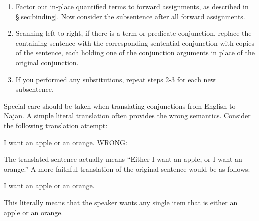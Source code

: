 \begin{enumerate}
	\item Factor out in-place quantified terms to forward assignments, as
	      described in \S\ref{sec:binding}. Now consider the subsentence after
	      all forward assignments.
	\item Scanning left to right, if there is a term or predicate conjunction,
	      replace the containing sentence with the corresponding sentential
	      conjunction with copies of the sentence, each holding one of the conjunction
	      arguments in place of the original conjunction.
	\item If you performed any substitutions, repeat steps 2-3 for each new
	      subsentence.
\end{enumerate}


Special care should be taken when translating conjunctions from English to
Najan. A simple literal translation often provides the wrong semantics. Consider
the following translation attempt:

{I want an apple or an orange.}
{WRONG: }

The translated sentence actually means ``Either I want an apple, or I want an
orange.'' A more faithful translation of the original sentence would be as
follows:

{I want an apple or an orange.}
{}

This literally means that the speaker wants any single item that is either an
apple or an orange.
